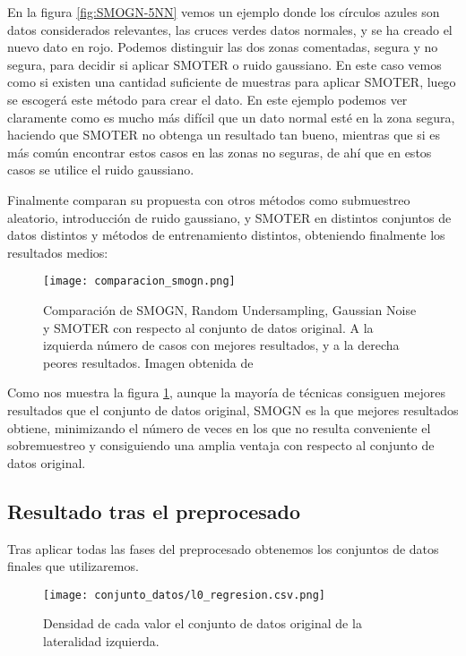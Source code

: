 En la figura \ref{fig:SMOGN-5NN} vemos un ejemplo donde los círculos azules son datos considerados relevantes, las cruces verdes datos normales, y se ha creado el nuevo dato en rojo. Podemos distinguir las dos zonas comentadas, segura y no segura, para decidir si aplicar SMOTER o ruido gaussiano. En este caso vemos como si existen una cantidad suficiente de muestras para aplicar SMOTER, luego se escogerá este método para crear el dato. En este ejemplo podemos ver claramente como es mucho más difícil que un dato normal esté en la zona segura, haciendo que SMOTER no obtenga un resultado tan bueno, mientras que si es más común encontrar estos casos en las zonas no seguras, de ahí que en estos casos se utilice el ruido gaussiano.

Finalmente comparan su propuesta con otros métodos como submuestreo aleatorio, introducción de ruido gaussiano, y SMOTER en distintos conjuntos de datos distintos y métodos de entrenamiento distintos, obteniendo finalmente los resultados medios:

\begin{figure}[H]
    \centering
	  \texttt{[image: comparacion\_smogn.png]}
    \caption{Comparación de SMOGN, Random Undersampling, Gaussian Noise y SMOTER con respecto al conjunto de datos original. A la izquierda número de casos con mejores resultados, y a la derecha peores resultados. Imagen obtenida de \cite{SMOGN}}
	 \label{fig:comparacion_smogn}
\end{figure}

Como nos muestra la figura \ref{fig:comparacion_smogn}, aunque la mayoría de técnicas consiguen mejores resultados que el conjunto de datos original, SMOGN es la que mejores resultados obtiene, minimizando el número de veces en los que no resulta conveniente el sobremuestreo y consiguiendo una amplia ventaja con respecto al conjunto de datos original.


\newpage

\subsection{Resultado tras el preprocesado}

Tras aplicar todas las fases del preprocesado obtenemos los conjuntos de datos finales que utilizaremos.

\begin{figure}[H]
    \centering
	  \texttt{[image: conjunto\_datos/l0\_regresion.csv.png]}
    \caption{Densidad de cada valor el conjunto de datos original de la lateralidad izquierda.}
	 \label{fig:l0-orig}
\end{figure}

